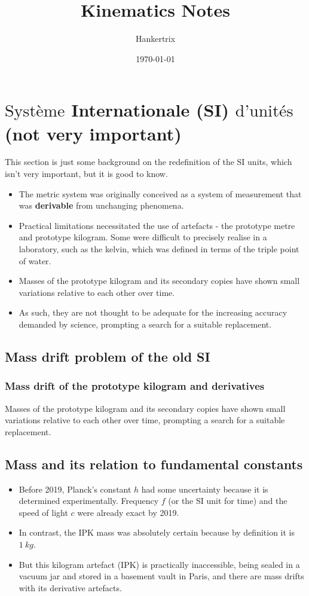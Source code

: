\documentclass[11pt]{article}
\author{Hankertrix}
\date{\today}
\title{Kinematics Notes}
\begin{document}
\maketitle
\setcounter{tocdepth}{2}
\tableofcontents \clearpage\section{\(\text{Syst\`eme}\) Internationale (SI) \(\text{d'unit\'es}\) (not very important)}
\label{sec:org459361d}

This section is just some background on the redefinition of the SI units, which isn't very important, but it is good to know.

\begin{itemize}
\item The metric system was originally conceived as a system of measurement that was \textbf{derivable} from unchanging phenomena.
\item Practical limitations necessitated the use of artefacts - the prototype metre and prototype kilogram. Some were difficult to precisely realise in a laboratory, such as the kelvin, which was defined in terms of the triple point of water.
\item Masses of the prototype kilogram and its secondary copies have shown small variations relative to each other over time.
\item As such, they are not thought to be adequate for the increasing accuracy demanded by science, prompting a search for a suitable replacement.
\end{itemize}
\subsection{Mass drift problem of the old SI}
\label{sec:orgfe99408}

\subsubsection{Mass drift of the prototype kilogram and derivatives}
\label{sec:org80047bf}
Masses of the prototype kilogram and its secondary copies have shown small variations relative to each other over time, prompting a search for a suitable replacement.
\subsection{Mass and its relation to fundamental constants}
\label{sec:org365d162}

\begin{itemize}
\item Before 2019, Planck's constant \(h\) had some uncertainty because it is determined experimentally. Frequency \(f\) (or the SI unit for time) and the speed of light \(c\) were already exact by 2019.
\item In contrast, the IPK mass was absolutely certain because by definition it is \(\qty{1}{kg}\).
\item But this kilogram artefact (IPK) is practically inaccessible, being sealed in a vacuum jar and stored in a basement vault in Paris, and there are mass drifts with its derivative artefacts.
\end{itemize}
\end{document}
